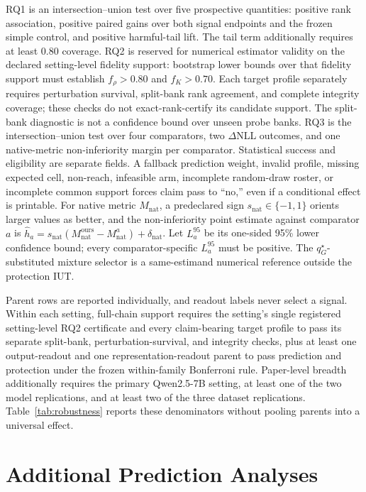 RQ1 is an intersection--union test over five prospective quantities: positive
rank association, positive paired gains over both signal endpoints and the
frozen simple control, and positive harmful-tail lift. The tail term
additionally requires at least 0.80 coverage. RQ2 is reserved for numerical
estimator validity on the declared setting-level fidelity support: bootstrap
lower bounds over that fidelity support must establish $f_\rho>0.80$ and
$f_K>0.70$. Each target profile separately requires perturbation survival,
split-bank rank agreement, and complete integrity coverage; these checks do
not exact-rank-certify its candidate support. The split-bank diagnostic is
not a confidence bound over unseen probe banks. RQ3 is the
intersection--union test over four comparators, two
$\Delta$NLL outcomes, and one native-metric non-inferiority margin per
comparator. Statistical success and eligibility are separate fields. A
fallback prediction weight, invalid profile, missing
expected cell, non-reach, infeasible arm, incomplete random-draw roster, or
incomplete common support forces claim pass to ``no,'' even if a conditional
effect is printable. For native metric $M_{\mathrm{nat}}$, a predeclared sign
$s_{\mathrm{nat}}\in\{-1,1\}$ orients larger values as better, and the
non-inferiority point estimate against comparator $a$ is
$\widehat h_a=s_{\mathrm{nat}}(M_{\mathrm{nat}}^{\mathrm{ours}}-
M_{\mathrm{nat}}^a)+\delta_{\mathrm{nat}}$. Let $L^{95}_a$ be its one-sided
95\% lower confidence bound; every comparator-specific $L^{95}_a$ must be
positive. The $q_G^\star$-substituted mixture selector is a
same-estimand numerical reference outside the protection IUT.

Parent rows are reported individually, and readout labels never select a signal.
Within each setting, full-chain support requires the setting's single
registered setting-level RQ2 certificate and every claim-bearing target profile
to pass its separate split-bank, perturbation-survival, and integrity checks,
plus at least one output-readout and one representation-readout parent to pass
prediction and protection under the frozen within-family Bonferroni rule.
Paper-level breadth additionally requires
the primary Qwen2.5-7B setting, at least one of the two model replications, and
at least two of the three dataset replications. Table~\ref{tab:robustness}
reports these denominators without pooling parents into a universal effect.

\FloatBarrier

\section{Additional Prediction Analyses}
\label{app:prediction-supp}


